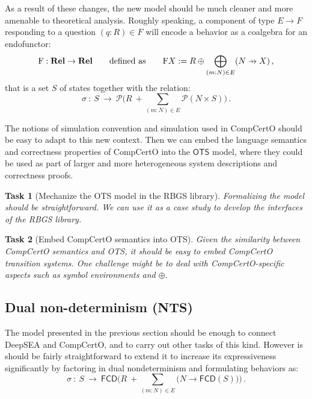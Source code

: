\documentclass{report}
\newtheorem{task}{Task}[chapter]
\newcommand\pfun{\mathrel{\ooalign{\hfil$\mapstochar\mkern5mu$\hfil\cr$\to$\cr}}}
\begin{document}
As a result of these changes,
the new model should be much cleaner and
more amenable to theoretical analysis.
Roughly speaking,
a component of type $E \rightarrow F$
responding to a question $(q \mathbin: R) \in F$
will encode a behavior
as a coalgebra for an endofunctor:
\[
  \mathrm{F} : \mathbf{Rel} \rightarrow \mathbf{Rel}
  \qquad \text{defined as} \qquad
  \mathrm{F} X := R \oplus \bigoplus_{(m \mathbin: N) \in E} (N \pfun X)
  \,,
\]
that is a set $S$ of states together with the relation:
\[
  \sigma \: : \: S \: \rightarrow \: \mathcal{P}
    \Big( R \: + \sum_{(m \mathbin: N) \in E} \mathcal{P}(N \times S) \Big)
  \,.
\]

The notions of simulation convention and simulation
used in CompCertO
should be easy to adapt
to this new context.
Then we can embed
the language semantics and correctness properties of CompCertO
into the $\mathsf{OTS}$ model,
where they could be used as part of
larger and more heterogeneous
system descriptions and correctness proofs.

\begin{task}[Mechanize the OTS model in the RBGS library]
Formalizing the model should be straightforward.
We can use it as a case study to develop the interfaces of the RBGS library.
\end{task}

\begin{task}[Embed CompCertO semantics into OTS]
Given the similarity between CompCertO semantics and OTS,
it should be easy to embed CompCertO transition systems.
One challenge might be to deal with CompCertO-specific aspects
such as symbol environments and $\oplus$.
\end{task}


\subsection{Dual non-determinism (NTS)} %

The model presented in the previous section
should be enough to connect DeepSEA and CompCertO,
and to carry out other tasks of this kind.
However is should be fairly straightforward to extend it
to increase its expressiveness significantly
by factoring in dual nondeterminism
and formulating behaviors as:
\[
  \sigma \: : \: S \: \rightarrow \: \mathsf{FCD}
    \Big( R \: + \sum_{(m \mathbin: N) \in E}
        \big( N \rightarrow \mathsf{FCD}(S) \big) \Big)
  \,.
\]

\end{document}
